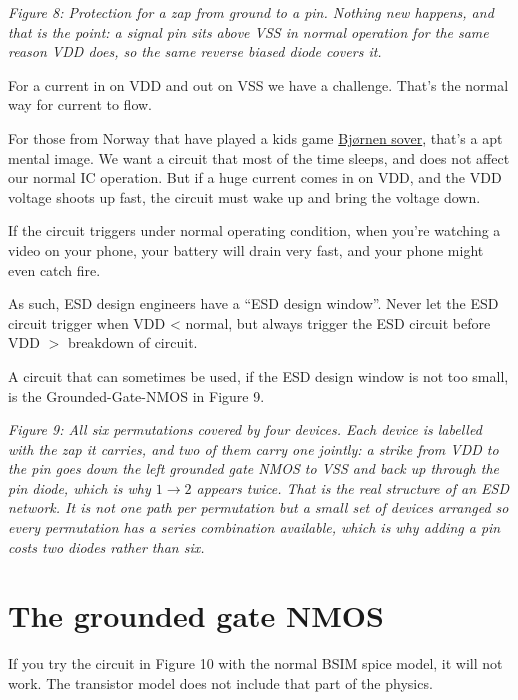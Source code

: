 {
\centering
{}
}

\emph{Figure 8: Protection for a zap from ground to a pin. Nothing new
happens, and that is the point: a signal pin sits above VSS in normal
operation for the same reason VDD does, so the same reverse biased diode
covers it.}

For a current in on VDD and out on VSS we have a challenge. That's the
normal way for current to flow.

For those from Norway that have played a kids game
\href{https://www.youtube.com/watch?v=jtZ1R9_Lu-4}{Bjørnen sover},
that's a apt mental image. We want a circuit that most of the time
sleeps, and does not affect our normal IC operation. But if a huge
current comes in on VDD, and the VDD voltage shoots up fast, the circuit
must wake up and bring the voltage down.

If the circuit triggers under normal operating condition, when you're
watching a video on your phone, your battery will drain very fast, and
your phone might even catch fire.

As such, ESD design engineers have a ``ESD design window''. Never let
the ESD circuit trigger when VDD \textless{} normal, but always trigger
the ESD circuit before VDD \(>\) breakdown of circuit.

A circuit that can sometimes be used, if the ESD design window is not
too small, is the Grounded-Gate-NMOS in Figure 9.


{
\centering
{}
}

\emph{Figure 9: All six permutations covered by four devices. Each
device is labelled with the zap it carries, and two of them carry one
jointly: a strike from VDD to the pin goes down the left grounded gate
NMOS to VSS and back up through the pin diode, which is why
\(1\rightarrow2\) appears twice. That is the real structure of an ESD
network. It is not one path per permutation but a small set of devices
arranged so every permutation has a series combination available, which
is why adding a pin costs two diodes rather than six.}

\section{The grounded gate NMOS}\label{the-grounded-gate-nmos}

If you try the circuit in Figure 10 with the normal BSIM spice model, it
will not work. The transistor model does not include that part of the
physics.

